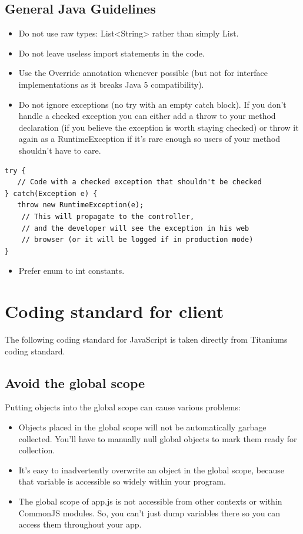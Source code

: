 \documentclass[11pt]{book}
\begin{document}
\subsection{General Java Guidelines}
\begin{itemize}
	\item Do not use raw types: List<String> rather than simply List.
	\item Do not leave useless import statements in the code.
	\item Use the Override annotation whenever possible (but not for interface implementations as it breaks Java 5 compatibility).
	\item Do not ignore exceptions (no try with an empty catch block). If you don't handle a checked exception you can either add a throw to your method declaration (if you believe the exception is worth staying checked) or throw it again as a RuntimeException if it's rare enough so users of your method shouldn't have to care.
\end{itemize}
\begin{lstlisting}[frame=single]
try {
   // Code with a checked exception that shouldn't be checked
} catch(Exception e) {
   throw new RuntimeException(e);
    // This will propagate to the controller,
    // and the developer will see the exception in his web
    // browser (or it will be logged if in production mode)
}
\end{lstlisting}
\begin{itemize}
	\item Prefer enum to int constants.
\end{itemize}

\section{Coding standard for client}
The following coding standard for JavaScript is taken directly from Titaniums coding standard\cite{titaniumCodingStandard}.

\subsection{Avoid the global scope}
Putting objects into the global scope can cause various problems:
\begin{itemize}
	\item Objects placed in the global scope will not be automatically garbage collected. You'll have to manually null global objects to mark them ready for collection.
	\item It's easy to inadvertently overwrite an object in the global scope, because that variable is accessible so widely within your program.
	\item The global scope of app.js is not accessible from other contexts or within CommonJS modules. So, you can't just dump variables there so you can access them throughout your app.
\end{itemize}
\end{document}
